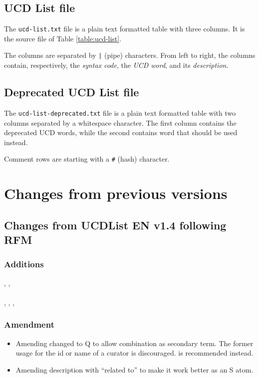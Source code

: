 \documentclass[11pt,a4paper]{ivoa}
\begin{document}
\subsection{UCD List file}
The \texttt{ucd-list.txt} file is a plain text formatted table with
three columns.
It is the source file of Table \ref{table:ucd-list}.

The columns are separated by \texttt{|} (pipe) characters. From left to right, the 
columns contain, respectively, the \emph{syntax code}, the \emph{UCD word}, and its
\emph{description}. 

\subsection{Deprecated UCD List file}
The \texttt{ucd-list-deprecated.txt} file is a plain text formatted table with two
columns separated by a whitespace character. The first column contains the deprecated 
UCD words, while the second contains word that should be used instead.

Comment rows are starting with a \texttt{\#} (hash) character.

\section{Changes from previous versions}
\subsection{Changes from UCDList EN v1.4 following RFM}
\subsubsection*{Additions}
, , \\
 \\
, , ,  \\

\subsubsection*{Amendment}
\begin{itemize}
\item Amending  changed to Q to allow combination as secondary term.
The former usage  for the id or name of a curator is
discouraged.  is recommended instead.
\item Amending  description with ``related to'' to make
it work better as an S atom.
\end{itemize}
\end{document}
